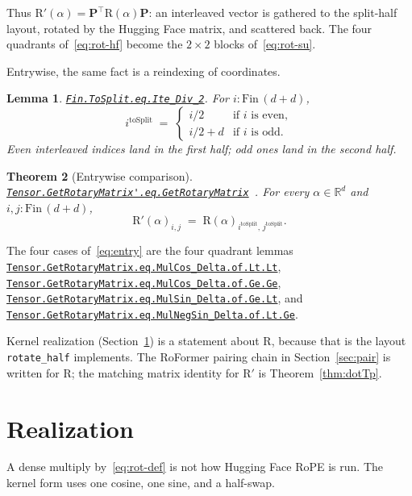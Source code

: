 \documentclass[11pt,a4paper]{article}
\newcommand{\lmod}[1]{\href{http://www.lemma.cn/lean/?module=#1}{\nolinkurl{#1}}}
\newtheorem{theorem}{Theorem}[section]
\newtheorem{lemma}[theorem]{Lemma}
\newcommand{\R}{\mathbb{R}}
\newcommand{\rot}{\mathrm{R}}
\begin{document}
Thus \(\rot'(\alpha)=\boldsymbol{P}^\top\rot(\alpha)\boldsymbol{P}\): an interleaved vector is gathered to the split-half layout, rotated by the Hugging Face matrix, and scattered back.
The four quadrants of~\eqref{eq:rot-hf} become the \(2\times 2\) blocks of~\eqref{eq:rot-su}.

Entrywise, the same fact is a reindexing of coordinates.

\begin{lemma}
\label{lem:toSplit}
\lmod{Fin.ToSplit.eq.Ite_Div_2}.
For \(i:\mathrm{Fin}\,(d+d)\),
\begin{equation}
  i^{\mathrm{toSplit}}
  \;=\;
  \begin{cases}
    i/2 & \text{if \(i\) is even},\\
    i/2+d & \text{if \(i\) is odd}.
  \end{cases}
\end{equation}
Even interleaved indices land in the first half; odd ones land in the second half.
\end{lemma}

\begin{theorem}[Entrywise comparison]
\label{thm:entry}
\lmod{Tensor.GetRotaryMatrix'.eq.GetRotaryMatrix}~\cite{lemma_rope_entry}.
For every \(\alpha\in\R^d\) and \(i,j:\mathrm{Fin}\,(d+d)\),
\begin{equation}
  \label{eq:entry}
  \rot'(\alpha)_{i,j}
  \;=\;
  \rot(\alpha)_{i^{\mathrm{toSplit}},\,j^{\mathrm{toSplit}}}.
\end{equation}
\end{theorem}

The four cases of~\eqref{eq:entry} are the four quadrant lemmas
\lmod{Tensor.GetRotaryMatrix.eq.MulCos_Delta.of.Lt.Lt},
\lmod{Tensor.GetRotaryMatrix.eq.MulCos_Delta.of.Ge.Ge},
\lmod{Tensor.GetRotaryMatrix.eq.MulSin_Delta.of.Ge.Lt},
and
\lmod{Tensor.GetRotaryMatrix.eq.MulNegSin_Delta.of.Lt.Ge}.

Kernel realization (Section~\ref{sec:real}) is a statement about \(\rot\), because that is the layout \texttt{rotate\_half} implements.
The RoFormer pairing chain in Section~\ref{sec:pair} is written for \(\rot\); the matching matrix identity for \(\rot'\) is Theorem~\ref{thm:dotTp}.

\section{Realization}
\label{sec:real}

A dense multiply by~\eqref{eq:rot-def} is not how Hugging Face RoPE is run.
The kernel form uses one cosine, one sine, and a half-swap.
\end{document}
